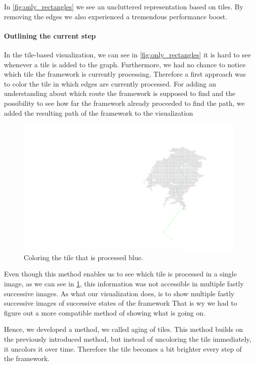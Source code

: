 \documentclass
[
    paper = a4,
    pagesize,
    12 pt,
    oneside,                       %
    open = right,
    DIV = calc,
    BCOR = 0 mm,                   %
    bibtotoc
]
{scrbook}
\begin{document}
In \cref{fig:only_rectangles} we see an uncluttered representation based on tiles.
By removing the edges we also experienced a tremendous performance boost.


\paragraph{Outlining the current step}

In the tile-based visualization, we can see in \cref{fig:only_rectangles} it is hard to see whenever a tile is added to the graph.
Furthermore, we had no chance to notice which tile the framework is currently processing.
Therefore a first approach was to color the tile in which edges are currently processed.
For adding an understanding about which route the framework is supposed to find and the possibility to see how far the framework already proceeded to find the path, we added the resulting path of the framework to the visualization

\begin{figure}[H]
        \includegraphics[width=\textwidth]{Images/vis-current-tile.png}
\caption[]{Coloring the tile that is processed blue.}
\label{fig:color_current_tile}
\end{figure}

Even though this method enables us to see which tile is processed in a single image, as we can see in \cref{fig:color_current_tile}, this information was not accessible in multiple fastly successive images.
As what our visualization does, is to show multiple fastly successive images of successive states of the framework
That is wy we had to figure out a more compatible method of showing what is going on.

Hence, we developed a method, we called aging of tiles.
This method builds on the previously introduced method, but instead of uncoloring the tile immediately, it uncolors it over time.
Therefore the tile becomes a bit brighter every step of the framework.
\end{document}

